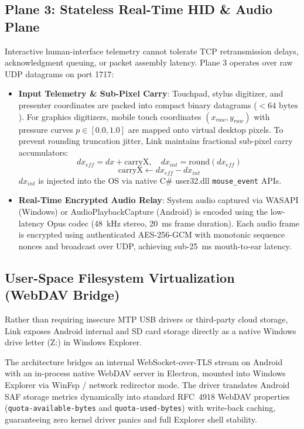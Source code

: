 \documentclass[conference]{IEEEtran}
\begin{document}
\subsection{Plane 3: Stateless Real-Time HID \& Audio Plane}
Interactive human-interface telemetry cannot tolerate TCP retransmission delays, acknowledgment queuing, or packet assembly latency. Plane 3 operates over raw UDP datagrams on port 1717:
\begin{itemize}
    \item \textbf{Input Telemetry \& Sub-Pixel Carry}: Touchpad, stylus digitizer, and presenter coordinates are packed into compact binary datagrams ($<64\text{ bytes}$). For graphics digitizers, mobile touch coordinates $(x_{raw}, y_{raw})$ with pressure curves $p \in [0.0, 1.0]$ are mapped onto virtual desktop pixels. To prevent rounding truncation jitter, Link maintains fractional sub-pixel carry accumulators:
    \begin{equation}
    dx_{eff} = dx + \text{carryX}, \quad dx_{int} = \text{round}(dx_{eff})
    \end{equation}
    \begin{equation}
    \text{carryX} \leftarrow dx_{eff} - dx_{int}
    \end{equation}
    $dx_{int}$ is injected into the OS via native C\# user32.dll \texttt{mouse\_event} APIs.
    \item \textbf{Real-Time Encrypted Audio Relay}: System audio captured via WASAPI (Windows) or AudioPlaybackCapture (Android) is encoded using the low-latency Opus codec (48~kHz stereo, 20~ms frame duration). Each audio frame is encrypted using authenticated AES-256-GCM with monotonic sequence nonces and broadcast over UDP, achieving sub-25~ms mouth-to-ear latency.
\end{itemize}

\subsection{User-Space Filesystem Virtualization (WebDAV Bridge)}
Rather than requiring insecure MTP USB drivers or third-party cloud storage, Link exposes Android internal and SD card storage directly as a native Windows drive letter (Z:) in Windows Explorer. 

The architecture bridges an internal WebSocket-over-TLS stream on Android with an in-process native WebDAV server in Electron, mounted into Windows Explorer via WinFsp / network redirector mode. The driver translates Android SAF storage metrics dynamically into standard RFC~4918 WebDAV properties (\texttt{quota-available-bytes} and \texttt{quota-used-bytes}) with write-back caching, guaranteeing zero kernel driver panics and full Explorer shell stability.
\end{document}

